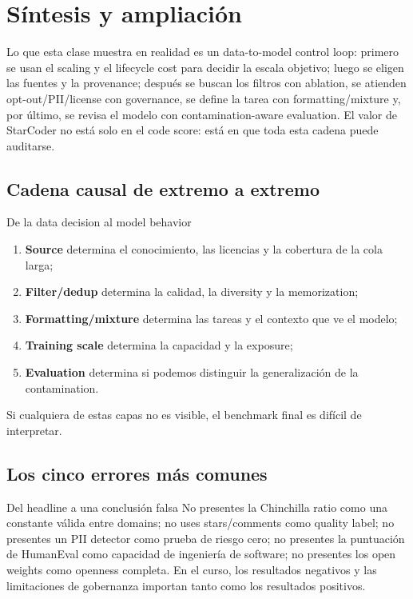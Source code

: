\section{Síntesis y ampliación}

Lo que esta clase muestra en realidad es un data-to-model control loop: primero se usan el scaling y el lifecycle cost para decidir la escala objetivo; luego se eligen las fuentes y la provenance; después se buscan los filtros con ablation, se atienden opt-out/PII/license con governance, se define la tarea con formatting/mixture y, por último, se revisa el modelo con contamination-aware evaluation. El valor de StarCoder no está solo en el code score: está en que toda esta cadena puede auditarse.

\subsection{Cadena causal de extremo a extremo}

\begin{importantbox}{De la data decision al model behavior}
\begin{enumerate}
  \item \textbf{Source} determina el conocimiento, las licencias y la cobertura de la cola larga;
  \item \textbf{Filter/dedup} determina la calidad, la diversity y la memorization;
  \item \textbf{Formatting/mixture} determina las tareas y el contexto que ve el modelo;
  \item \textbf{Training scale} determina la capacidad y la exposure;
  \item \textbf{Evaluation} determina si podemos distinguir la generalización de la contamination.
\end{enumerate}
Si cualquiera de estas capas no es visible, el benchmark final es difícil de interpretar.
\end{importantbox}

\subsection{Los cinco errores más comunes}

\begin{warningbox}{Del headline a una conclusión falsa}
No presentes la Chinchilla ratio como una constante válida entre domains; no uses stars/comments como quality label; no presentes un PII detector como prueba de riesgo cero; no presentes la puntuación de HumanEval como capacidad de ingeniería de software; no presentes los open weights como openness completa. En el curso, los resultados negativos y las limitaciones de gobernanza importan tanto como los resultados positivos.
\end{warningbox}

